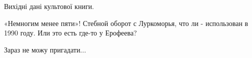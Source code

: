  
 
 
 
 
Вихідні дані культової книги.

«Немногим менее пяти»! Стебной оборот с Луркоморья, что ли - использован в 1990 году. Или это есть где-то у Ерофеева?

Зараз не можу пригадати...
